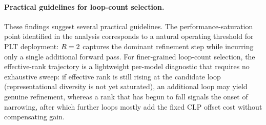 \paragraph{Practical guidelines for loop-count selection.}
These findings suggest several practical guidelines.
The performance-saturation point identified in the analysis corresponds to
a natural operating threshold for PLT deployment: $R = 2$ captures the
dominant refinement step while incurring only a single additional forward pass.
For finer-grained loop-count selection, the effective-rank trajectory is a
lightweight per-model diagnostic that requires no exhaustive sweep: if effective
rank is still rising at the candidate loop (representational diversity is not
yet saturated), an additional loop may yield genuine refinement, whereas a rank
that has begun to fall signals the onset of narrowing, after which further loops
mostly add the fixed CLP offset cost without compensating gain.
